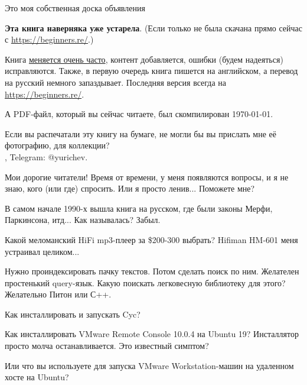 
\begin{center}
\LARGE{} Это моя собственная доска объявления \normalsize{}
\end{center}

\textbf{Эта книга наверняка уже устарела}.
(Если только не была скачана прямо сейчас с \url{https://beginners.re/}.)

Книга \href{https://github.com/DennisYurichev/RE-for-beginners/commits/master}{меняется очень часто},
контент добавляется, ошибки (будем надеяться) исправляются.
Также, в первую очередь книга пишется на английском, а перевод на русский немного запаздывает.
Последняя версия всегда на \url{https://beginners.re/}.

А PDF-файл, который вы сейчас читаете, был скомпилирован \today{}.

\myhrule{}

Если вы распечатали эту книгу на бумаге, не могли бы вы прислать мне её фотографию, для коллекции?\\
\EMAIL{}, Telegram: @yurichev.

\myhrule{}

Мои дорогие читатели! Время от времени, у меня появляются вопросы, и я не знаю, кого (или где) спросить.
Или я просто ленив...
Поможете мне?

\myhrule{}

В самом начале 1990-х вышла книга на русском, где были законы Мерфи, Паркинсона, итд...
Как называлась?
Забыл.

\myhrule{}

Какой меломанский HiFi mp3-плеер за \$200-300 выбрать?
Hifiman HM-601 меня устраивал целиком...

\myhrule{}

Нужно проиндексировать пачку текстов. Потом сделать поиск по ним. Желателен простенький query-язык.
Какую поискать легковесную библиотеку для этого?
Желательно Питон или С++.

\myhrule{}

Как инсталлировать и запускать Cyc?

\myhrule{}

Как инсталлировать VMware Remote Console 10.0.4 на Ubuntu 19? Инсталлятор просто молча останавливается. Это известный симптом?

Или что вы используете для запуска VMware Workstation-машин на удаленном хосте на Ubuntu?

\myhrule{}

